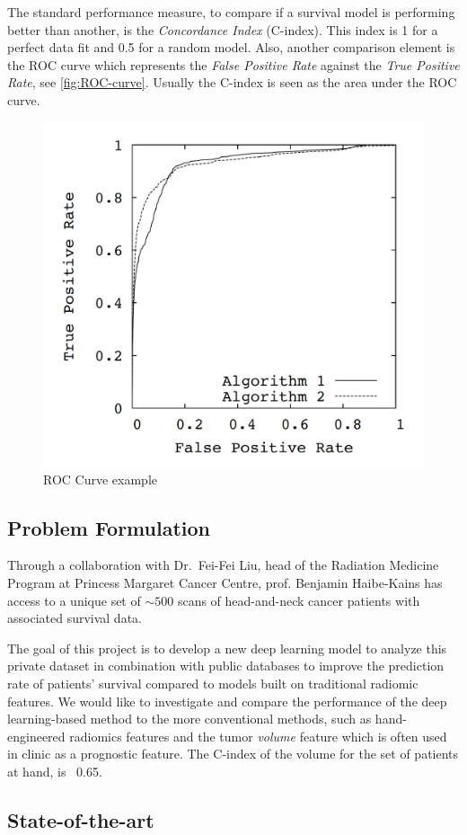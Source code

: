 The standard performance measure, to compare if a survival 
model is performing better than another, is the \emph{Concordance Index} (C-index). This 
index is 1 for a perfect data fit and 0.5 for a random model. Also, another comparison 
element is the ROC curve which represents the \emph{False Positive Rate} against the 
\emph{True Positive Rate}, see \autoref{fig:ROC-curve}. Usually the C-index is seen as 
the area under the ROC curve.
~\cites{neural:roc-precision-recall}{medical:ranking-ci}

\begin{figure}
  \centering
  \includegraphics[width=.5\linewidth]{images/roc_curve}
  \caption{ROC Curve example\label{fig:ROC-curve}}
\end{figure}

\subsection{Problem Formulation}

Through a collaboration with Dr.~Fei-Fei Liu, head of the Radiation Medicine Program at Princess
Margaret Cancer Centre, prof. Benjamin Haibe-Kains has access to a unique set of \( {\sim}500 \) 
scans of head-and-neck cancer patients with associated survival data. 

The goal of this project is to develop a new deep learning model to analyze this private 
dataset in combination with public databases to improve the prediction rate of patients' 
survival compared to models built on traditional radiomic features. We would like to 
investigate and compare the performance of the deep learning-based method 
to the more conventional methods, such as hand-engineered radiomics features and the tumor 
\emph{volume} feature which is often used in clinic as a prognostic feature. The C-index 
of the volume for the set of patients at hand, is ~0.65.

\subsection{State-of-the-art}

